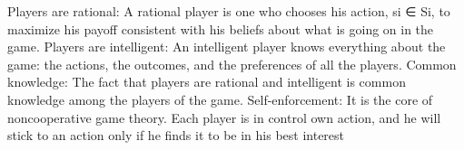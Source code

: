 \documentclass[9pt]{article}
\begin{document}
   Players are rational: A rational player is one who chooses his action,
 si ∈ Si, to maximize his payoff consistent with his beliefs about
 what is going on in the game.
 Players are intelligent: An intelligent player knows everything about
 the game: the actions, the outcomes, and the preferences of all the
 players.
 Common knowledge: The fact that players are rational and
 intelligent is common knowledge among the players of the game.
 Self-enforcement: It is the core of noncooperative game theory.
 Each player is in control own action, and he will stick to an action
 only if he finds it to be in his best interest
\end{document}
